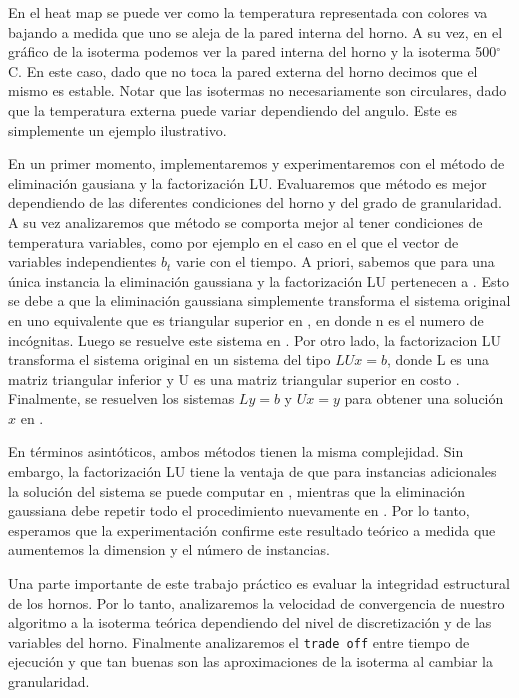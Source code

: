 En el heat map se puede ver como la temperatura representada con colores va bajando a medida que uno se aleja de la pared interna del horno. A su vez, en el gráfico de la isoterma podemos ver la pared interna del horno y la isoterma 500$^{\circ}$C. En este caso, dado que no toca la pared externa del horno decimos que el mismo es estable. Notar que las isotermas no necesariamente son circulares, dado que la temperatura externa puede variar dependiendo del angulo. Este es simplemente un ejemplo ilustrativo.

En un primer momento, implementaremos y experimentaremos con el método de eliminación gausiana y la factorización LU. Evaluaremos que método es mejor dependiendo de las diferentes condiciones del horno y del grado de granularidad. A su vez analizaremos que método se comporta mejor al tener condiciones de temperatura variables, como por ejemplo en el caso en el que el vector de variables independientes $b_t$ varie con el tiempo. A priori, sabemos que para una única instancia la eliminación gaussiana y la factorización LU pertenecen a . Esto se debe a que la eliminación gaussiana simplemente transforma el sistema original en uno equivalente que es triangular superior en , en donde n es el numero de incógnitas. Luego se resuelve este sistema en . Por otro lado, la factorizacion LU transforma el sistema original en un sistema del tipo $LUx = b$, donde L es una matriz triangular inferior y U es una matriz triangular superior en costo . Finalmente, se resuelven los sistemas $Ly = b$ y $Ux = y$ para obtener una solución $x$ en .

En términos asintóticos, ambos métodos tienen la misma complejidad. Sin embargo, la factorización LU tiene la ventaja de que para instancias adicionales la solución del sistema se puede computar en , mientras que la eliminación gaussiana debe repetir todo el procedimiento nuevamente en . Por lo tanto, esperamos que la experimentación confirme este resultado teórico a medida que aumentemos la dimension y el número de instancias.

Una parte importante de este trabajo práctico es evaluar la integridad estructural de los hornos. Por lo tanto, analizaremos la velocidad de convergencia de nuestro algoritmo a la isoterma teórica dependiendo del nivel de discretización y de las variables del horno. Finalmente analizaremos el \texttt{trade off} entre tiempo de ejecución y que tan buenas son las aproximaciones de la isoterma al cambiar la granularidad.
